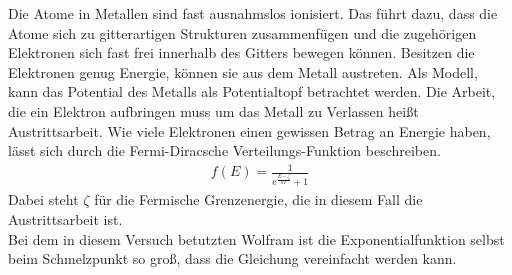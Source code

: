 Die Atome in Metallen sind fast ausnahmslos ionisiert. Das führt dazu, dass die Atome sich zu gitterartigen Strukturen zusammenfügen und die zugehörigen Elektronen sich fast frei innerhalb des Gitters bewegen können. Besitzen die Elektronen genug Energie, können sie aus dem Metall austreten. Als Modell, kann das Potential des Metalls als Potentialtopf betrachtet werden. Die Arbeit, die ein Elektron aufbringen muss um das Metall zu Verlassen heißt Austrittsarbeit.
Wie viele Elektronen einen gewissen Betrag an Energie haben, lässt sich durch die Fermi-Diracsche Verteilungs-Funktion beschreiben.
\begin{align}
f(E)=\frac{1}{e^\frac{E-\zeta}{kT}+1}
\end{align}
Dabei steht $\zeta$ für die Fermische Grenzenergie, die in diesem Fall die Austrittsarbeit ist.
\\ 
Bei dem in diesem Versuch betutzten Wolfram ist die Exponentialfunktion selbst beim Schmelzpunkt so groß, dass die Gleichung vereinfacht werden kann.
 
